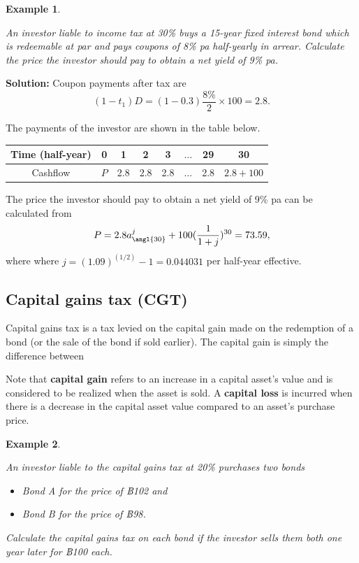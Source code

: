 \documentclass[
]{book}
\theoremstyle{definition}
\theoremstyle{definition}
\newtheorem{example}{Example}[chapter]
\theoremstyle{definition}
\theoremstyle{definition}
\theoremstyle{remark}
\begin{document}
\begin{example}
\protect\hypertarget{exm:unlabeled-div-56}{}\label{exm:unlabeled-div-56}

\emph{An investor liable to income tax at 30\% buys a 15-year fixed interest
bond which is redeemable at par and pays coupons of 8\% pa half-yearly in
arrear. Calculate the price the investor should pay to obtain a net
yield of 9\% pa.}

\end{example}

\textbf{Solution:} Coupon payments after tax are
\[ (1 - t_1) D = (1 - 0.3) \frac{8\%}{2} \times 100 = 2.8.\]

The payments of the investor are shown in the table below.

\begin{longtable}[]{@{}cccccccc@{}}
\toprule
Time (half-year) & 0 & 1 & 2 & 3 & \(\ldots\) & 29 & 30 \\
\midrule
\endhead
Cashflow & \(P\) & 2.8 & 2.8 & 2.8 & \(\ldots\) & 2.8 & \(2.8 + 100\) \\
\bottomrule
\end{longtable}

The price the investor should pay to obtain a net yield of 9\% pa can be
calculated from
\[P = 2.8 a^j_{\angl{30}} + 100 (\frac{1}{1+j})^{30} = 73.59,\] where
where \(j = (1.09)^{(1/2)} - 1 = 0.044031\) per half-year effective.

\hypertarget{capital-gains-tax-cgt}{%
\subsection{Capital gains tax (CGT)}\label{capital-gains-tax-cgt}}

Capital gains tax is a tax levied on the capital gain made on the
redemption of a bond (or the sale of the bond if sold earlier). The
capital gain is simply the difference between

Note that \textbf{capital gain} refers to an increase in a capital asset's
value and is considered to be realized when the asset is sold. A
\textbf{capital loss} is incurred when there is a decrease in the capital
asset value compared to an asset's purchase price.

\begin{example}
\protect\hypertarget{exm:unlabeled-div-57}{}\label{exm:unlabeled-div-57}

\emph{An investor liable to the capital gains tax at 20\% purchases two bonds}

\begin{itemize}
\item
  \emph{Bond A for the price of ฿102 and}
\item
  \emph{Bond B for the price of ฿98.}
\end{itemize}

\emph{Calculate the capital gains tax on each bond if the investor sells them
both one year later for ฿100 each.}

\end{example}
\end{document}
